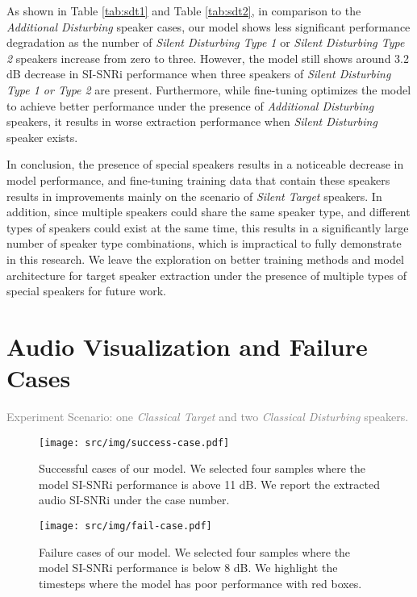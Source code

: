 As shown in Table \ref{tab:sdt1} and Table \ref{tab:sdt2}, in comparison to the \textit{Additional Disturbing} speaker cases, our model shows less significant performance degradation as the number of \textit{Silent Disturbing Type 1} or \textit{Silent Disturbing Type 2} speakers increase from zero to three. However, the model still shows around 3.2 dB decrease in SI-SNRi performance when three speakers of \textit{Silent Disturbing Type 1 or Type 2} are present. Furthermore, while fine-tuning optimizes the model to achieve better performance under the presence of \textit{Additional Disturbing} speakers, it results in worse extraction performance when \textit{Silent Disturbing} speaker exists.

In conclusion, the presence of special speakers results in a noticeable decrease in model performance, and fine-tuning training data that contain these speakers results in improvements mainly on the scenario of \textit{Silent Target} speakers. In addition, since multiple speakers could share the same speaker type, and different types of speakers could exist at the same time, this results in a significantly large number of speaker type combinations, which is impractical to fully demonstrate in this research. We leave the exploration on better training methods and model architecture for target speaker extraction under the presence of multiple types of special speakers for future work. 


\section{Audio Visualization and Failure Cases}

\textcolor{gray}{Experiment Scenario: one \textit{Classical Target} and two \textit{Classical Disturbing} speakers.}

\begin{figure}[!t]
\centering
\begin{center}

\centerline{\texttt{[image: src/img/success-case.pdf]}}
\caption{Successful cases of our model. We selected four samples where the model SI-SNRi performance is above 11 dB. We report the extracted audio SI-SNRi under the case number.}
\label{fig:success-case}
\end{center}
\vskip -0.3in
\end{figure}

\begin{figure}[t]
\begin{center}
\centerline{\texttt{[image: src/img/fail-case.pdf]}}
\caption{Failure cases of our model. We selected four samples where the model SI-SNRi performance is below 8 dB. We highlight the timesteps where the model has poor performance with red boxes.}
\label{fig:fail-case}
\end{center}
\vskip -0.3in
\end{figure}


